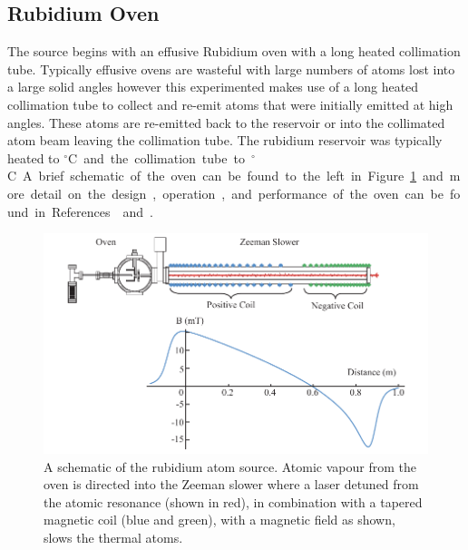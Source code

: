 \subsection{Rubidium Oven}
The source begins with an effusive Rubidium oven with a long heated collimation tube.
Typically effusive ovens are wasteful with large numbers of atoms lost into a large solid angles however this experimented makes use of a long heated collimation tube to collect and re-emit atoms that were initially emitted at high angles.
These atoms are re-emitted back to the reservoir or into the collimated atom beam leaving the collimation tube.
The rubidium reservoir was typically heated to \unit[80]{$^\circ$C} and the collimation tube to \unit[120]{$^\circ$C}.
A brief schematic of the oven can be found to the left in Figure~\ref{figure:zeemanoven} and more detail on the design, operation, and performance of the oven can be found in References~\cite{bell_slow_2010} and \cite{bell_cold_2011}.

\begin{figure}
    \center
    \includegraphics[width=145mm]{part2/Figs/ZeemanOven.pdf}
    \caption{A schematic of the rubidium atom source. Atomic vapour from the oven is directed into the Zeeman slower where a laser detuned from the atomic resonance (shown in red), in combination with a tapered magnetic coil (blue and green), with a magnetic field as shown, slows the thermal atoms.}
    \label{figure:zeemanoven}
\end{figure}

